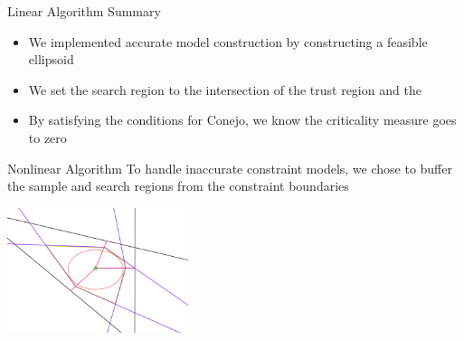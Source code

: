 \documentclass{beamer}
\begin{document}
\begin{frame}{Linear Algorithm Summary}
	\begin{itemize}
		\item We implemented accurate model construction by constructing a feasible ellipsoid
		\item We set the search region to the intersection of the trust region and the 
		\item By satisfying the conditions for Conejo, we know the criticality measure goes to zero
	\end{itemize}
\end{frame}

% 	

% 


\begin{frame}{Nonlinear Algorithm}
	To handle inaccurate constraint models, 
	we chose to buffer the sample and search regions from the constraint boundaries
	
	\begin{center}
		\includegraphics[width=200px]{images/completed_2.png}
	\end{center}
	
\end{frame}
\end{document}
